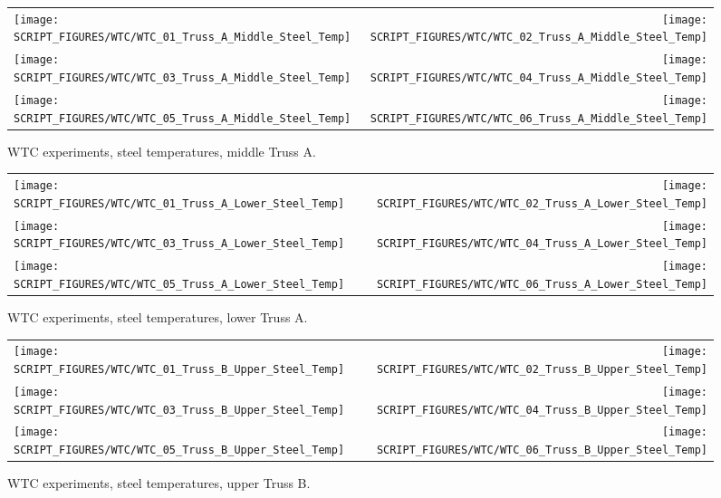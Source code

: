 \begin{figure}[p]
\begin{tabular*}{\textwidth}{l@{\extracolsep{\fill}}r}
\texttt{[image: SCRIPT\_FIGURES/WTC/WTC\_01\_Truss\_A\_Middle\_Steel\_Temp]} &
\texttt{[image: SCRIPT\_FIGURES/WTC/WTC\_02\_Truss\_A\_Middle\_Steel\_Temp]} \\
\texttt{[image: SCRIPT\_FIGURES/WTC/WTC\_03\_Truss\_A\_Middle\_Steel\_Temp]} &
\texttt{[image: SCRIPT\_FIGURES/WTC/WTC\_04\_Truss\_A\_Middle\_Steel\_Temp]} \\
\texttt{[image: SCRIPT\_FIGURES/WTC/WTC\_05\_Truss\_A\_Middle\_Steel\_Temp]} &
\texttt{[image: SCRIPT\_FIGURES/WTC/WTC\_06\_Truss\_A\_Middle\_Steel\_Temp]}
\end{tabular*}
\caption[WTC experiments, steel temperatures, middle Truss A]{WTC experiments, steel temperatures, middle Truss A.}
\label{NIST_WTC_Truss_A_Middle_Steel_Temp}
\end{figure}

\begin{figure}[p]
\begin{tabular*}{\textwidth}{l@{\extracolsep{\fill}}r}
\texttt{[image: SCRIPT\_FIGURES/WTC/WTC\_01\_Truss\_A\_Lower\_Steel\_Temp]} &
\texttt{[image: SCRIPT\_FIGURES/WTC/WTC\_02\_Truss\_A\_Lower\_Steel\_Temp]} \\
\texttt{[image: SCRIPT\_FIGURES/WTC/WTC\_03\_Truss\_A\_Lower\_Steel\_Temp]} &
\texttt{[image: SCRIPT\_FIGURES/WTC/WTC\_04\_Truss\_A\_Lower\_Steel\_Temp]} \\
\texttt{[image: SCRIPT\_FIGURES/WTC/WTC\_05\_Truss\_A\_Lower\_Steel\_Temp]} &
\texttt{[image: SCRIPT\_FIGURES/WTC/WTC\_06\_Truss\_A\_Lower\_Steel\_Temp]}
\end{tabular*}
\caption[WTC experiments, steel temperatures, lower Truss A]{WTC experiments, steel temperatures, lower Truss A.}
\label{NIST_WTC_Truss_A_Lower_Steel_Temp}
\end{figure}

\begin{figure}[p]
\begin{tabular*}{\textwidth}{l@{\extracolsep{\fill}}r}
\texttt{[image: SCRIPT\_FIGURES/WTC/WTC\_01\_Truss\_B\_Upper\_Steel\_Temp]} &
\texttt{[image: SCRIPT\_FIGURES/WTC/WTC\_02\_Truss\_B\_Upper\_Steel\_Temp]} \\
\texttt{[image: SCRIPT\_FIGURES/WTC/WTC\_03\_Truss\_B\_Upper\_Steel\_Temp]} &
\texttt{[image: SCRIPT\_FIGURES/WTC/WTC\_04\_Truss\_B\_Upper\_Steel\_Temp]} \\
\texttt{[image: SCRIPT\_FIGURES/WTC/WTC\_05\_Truss\_B\_Upper\_Steel\_Temp]} &
\texttt{[image: SCRIPT\_FIGURES/WTC/WTC\_06\_Truss\_B\_Upper\_Steel\_Temp]}
\end{tabular*}
\caption[WTC experiments, steel temperatures, upper Truss B]{WTC experiments, steel temperatures, upper Truss B.}
\label{NIST_WTC_Truss_B_Upper_Steel_Temp}
\end{figure}

